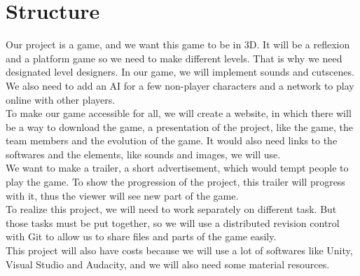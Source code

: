 \chapter{Structure}

	Our project is a game, and we want this game to be in 3D. It will be a reflexion and a platform game
	so we need to make different levels. That is why we need designated level designers. In our game,
	we will implement sounds and cutscenes. We also need to add an AI for a few non-player characters
	and a network to play online with other players.
	\\
	To make our game accessible for all, we will create a website, in which there will be a way to download the game,
	a presentation of the project, like the game, the team members and the evolution of the game.
	It would also need links to the softwares and the elements, like sounds and images, we will use.
	\\
	We want to make a trailer, a short advertisement, which would tempt people to play the game.
	To show the progression of the project, this trailer will progress with it,
	thus the viewer will see new part of the game.
	\\
	To realize this project, we will need to work separately on different task. But those tasks must be put together,
	so we will use a distributed revision control with Git to allow us to share files and parts of the game easily.
	\\
	This project will also have costs because we will use a lot of softwares like Unity, Visual Studio and Audacity,
	and we will also need some material resources.